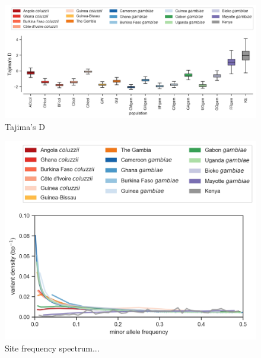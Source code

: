\documentclass[a4paper,11pt,abstracton,hidelinks]{scrartcl}
\begin{document}
\begin{figure}[H]
	\begin{center}
		\includegraphics*[width=6.3in]{artwork/Tajimas_D.jpeg}
	\end{center}
	\caption{Tajima's D}
	\label{TajD}
\end{figure}

\begin{figure}[H]
	\begin{center}
		\includegraphics*[width=6.3in]{artwork/sfs_all.jpeg}
	\end{center}
	\caption{Site frequency spectrum...}
	\label{sfs}
\end{figure}
\end{document}
